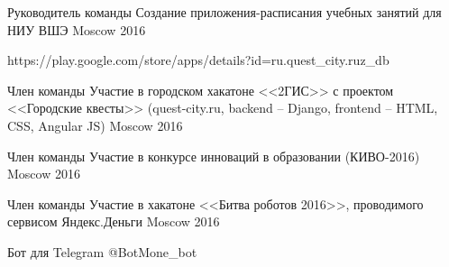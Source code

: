 


\begin{cventries}
	

\cventry
{Руководитель команды} %
{Создание приложения-расписания учебных занятий для НИУ ВШЭ} %
{Moscow} %
{2016} %
{
	\begin{cvitems}
		\item {https://play.google.com/store/apps/details?id=ru.quest\_city.ruz\_db}
	\end{cvitems}
}


\cventry
{Член команды} %
{Участие в городском хакатоне <<2ГИС>> с проектом <<Городские квесты>> (quest-city.ru, backend – Django, frontend – HTML, CSS, Angular JS)} %
{Moscow} %
{2016} %
{ %
}



\cventry
{Член команды} %
{Участие в конкурсе инноваций в образовании (КИВО-2016)} %
{Moscow} %
{2016} %
{ %
}


\cventry
{Член команды} %
{Участие в хакатоне <<Битва роботов 2016>>, проводимого сервисом Яндекс.Деньги} %
{Moscow} %
{2016} %
{ %
	\begin{cvitems}
		\item {Бот для Telegram @BotMone\_bot}
	\end{cvitems}
}


\end{cventries}
